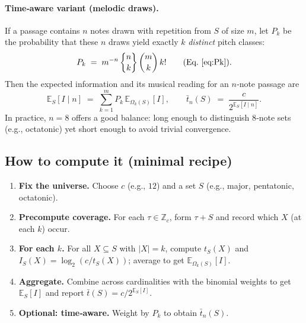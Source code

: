 \documentclass[10pt,twocolumn]{article}
\numberwithin{equation}{section} %
\newcommand{\Stirling}[2]{\genfrac\{\}{0pt}{}{#1}{#2}}
\begin{document}
    \paragraph{Time‑aware variant (melodic draws).}
    If a passage contains $n$ notes drawn with repetition from $S$ of size $m$, let $P_k$ be the probability that these $n$ draws yield exactly $k$ \emph{distinct} pitch classes:
    \[
        P_k \;=\; m^{-n}\,\Stirling{n}{k}\,\binom{m}{k}\,k!
        \qquad\text{(Eq.~\ref{eq:Pk}).}
    \]
    Then the expected information and its musical reading for an $n$‑note passage are
    \[
        \mathbb{E}_S[I \mid n] \;=\; \sum_{k=1}^{m} P_k \,\mathbb{E}_{\Omega_k(S)}[I],
        \qquad
        \bar{t}_n(S) \;=\; \frac{c}{2^{\mathbb{E}_S[I \mid n]}}.
    \]
    In practice, $n{=}8$ offers a good balance: long enough to distinguish 8‑note sets (e.g., octatonic) yet short enough to avoid trivial convergence.

    \subsection*{How to compute it (minimal recipe)}
    \begin{enumerate}
        \item \textbf{Fix the universe.} Choose $c$ (e.g., $12$) and a set $S$ (e.g., major, pentatonic, octatonic).
        \item \textbf{Precompute coverage.} For each $\tau\in \mathbb{Z}_c$, form $\tau{+}S$ and record which $X$ (at each $k$) occur.
        \item \textbf{For each $k$.} For all $X{\subseteq}S$ with $|X|{=}k$, compute $t_S(X)$ and $I_S(X)=\log_2(c/t_S(X))$; average to get $\mathbb{E}_{\Omega_k(S)}[I]$.
        \item \textbf{Aggregate.} Combine across cardinalities with the binomial weights to get $\mathbb{E}_S[I]$ and report $\bar{t}(S)=c/2^{\mathbb{E}_S[I]}$.
        \item \textbf{Optional: time‑aware.} Weight by $P_k$ to obtain $\bar{t}_n(S)$.
    \end{enumerate}
\end{document}
